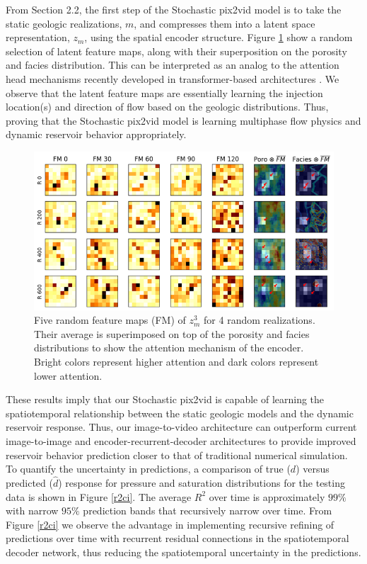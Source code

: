 \documentclass[10pt, twoside]{article}
\begin{document}
From Section 2.2, the first step of the Stochastic pix2vid model is to take the static geologic realizations, $m$, and compresses them into a latent space representation, $z_m$, using the spatial encoder structure. Figure \ref{feature_maps} show a random selection of latent feature maps, along with their superposition on the porosity and facies distribution. This can be interpreted as an analog to the attention head mechanisms recently developed in transformer-based architectures \cite{vaswani2017attention}. We observe that the latent feature maps are essentially learning the injection location(s) and direction of flow based on the geologic distributions. Thus, proving that the Stochastic pix2vid model is learning multiphase flow physics and dynamic reservoir behavior appropriately.

\begin{figure}
    \centering
    \includegraphics[width=\textwidth]{figures/feature_maps.png}
    \caption{Five random feature maps (FM) of $z_m^3$ for 4 random realizations. Their average is superimposed on top of the porosity and facies distributions to show the attention mechanism of the encoder. Bright colors represent higher attention and dark colors represent lower attention.}
    \label{feature_maps}
\end{figure}

These results imply that our Stochastic pix2vid is capable of learning the spatiotemporal relationship between the static geologic models and the dynamic reservoir response. Thus, our image-to-video architecture can outperform current image-to-image and encoder-recurrent-decoder architectures to provide improved reservoir behavior prediction closer to that of traditional numerical simulation. To quantify the uncertainty in predictions, a comparison of true ($d$) versus predicted ($\hat{d}$) response for pressure and saturation distributions for the testing data is shown in Figure \ref{r2ci}. The average $R^2$ over time is approximately $99\%$ with narrow $95\%$ prediction bands that recursively narrow over time. From Figure \ref{r2ci} we observe the advantage in implementing recursive refining of predictions over time with recurrent residual connections in the spatiotemporal decoder network, thus reducing the spatiotemporal uncertainty in the predictions.
\end{document}
